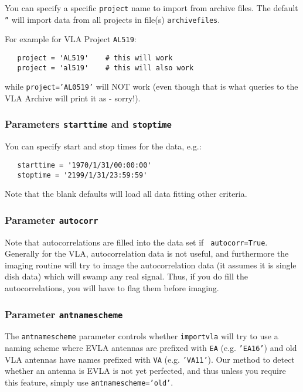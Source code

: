 You can specify a specific {\tt project} name to import from 
archive files.  The default {\tt ''} will import data from all
projects in file(s) {\tt archivefiles}.

For example for VLA Project {\tt AL519}:
\small
\begin{verbatim}
   project = 'AL519'    # this will work
   project = 'al519'    # this will also work
\end{verbatim}
\normalsize
while {\tt project='AL0519'} will NOT work (even though that is what
queries to the VLA Archive will print it as - sorry!).

\subsubsection{Parameters {\tt starttime} and {\tt stoptime} }
\label{section:io.import.vla.starttime}

You can specify start and stop times for the data, e.g.:
\small
\begin{verbatim}
   starttime = '1970/1/31/00:00:00'
   stoptime = '2199/1/31/23:59:59'
\end{verbatim}
\normalsize
Note that the blank defaults will load all data fitting other criteria.

\subsubsection{Parameter {\tt autocorr} }
\label{section:io.import.vla.autocorr}

Note that autocorrelations are filled into the data set if {\tt
autocorr=True}.  Generally for the VLA, autocorrelation data is not
useful, and furthermore the imaging routine will try to image the
autocorrelation data (it assumes it is single dish data) which will
swamp any real signal.  Thus, if you do fill the autocorrelations, you
will have to flag them before imaging.

\subsubsection{Parameter {\tt antnamescheme} }
\label{section:io.import.vla.antnamescheme}

The {\tt antnamescheme} parameter controls whether {\tt importvla}
will try to use a naming scheme where EVLA antennas are prefixed
with {\tt EA} (e.g. {\tt 'EA16'}) and old VLA antennas have names
prefixed with {\tt VA} (e.g. {\tt 'VA11'}).  Our method to detect
whether an antenna is EVLA is not yet perfected, and thus unless you
require this feature, simply use {\tt antnamescheme='old'}.


